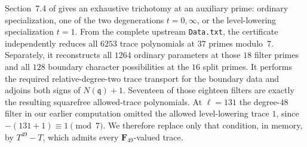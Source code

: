 \documentclass[11pt]{article}
\newcommand{\F}{\mathbf F}
\theoremstyle{definition}
\theoremstyle{remark}
\begin{document}
Section~7.4 of \cite{PVT} gives an exhaustive trichotomy at an auxiliary
prime: ordinary specialization, one of the two degenerations $t=0,\infty$,
or the level-lowering specialization $t=1$.  From the complete upstream
\texttt{Data.txt}, the certificate independently reduces all $6253$ trace
polynomials at $37$ primes modulo~$7$.  Separately, it reconstructs all
$1264$ ordinary parameters at those $18$ filter primes and all
$128$ boundary character possibilities at the $16$ split primes.  It
performs the required relative-degree-two trace transport for the boundary
data and adjoins both signs of $N(\mathfrak q)+1$.  Seventeen of those eighteen filters are exactly
the resulting squarefree allowed-trace polynomials.  At $\ell=131$ the
degree-$48$ filter in our earlier computation omitted the allowed level-lowering trace $1$,
since $-(131+1)\equiv1\pmod7$.  We therefore replace only that condition, in
memory, by $T^{49}-T$, which admits every $\F_{49}$-valued trace.
\end{document}
